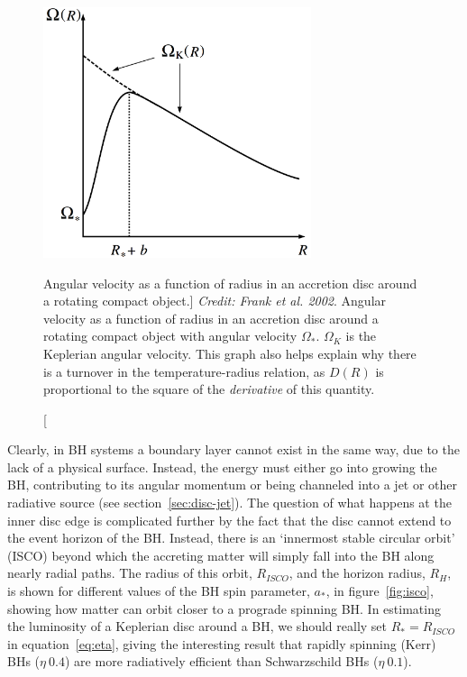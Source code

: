 \begin{figure}
\centering
\includegraphics[width=0.7\textwidth]{figures/01-intro/omega.png}
\caption
[Angular velocity as a function of radius in an accretion disc around a rotating
compact object.]
{
{\sl Credit: Frank et al. 2002}.
Angular velocity as a function of radius in an accretion disc around a rotating
compact object with angular velocity $\Omega_*$. $\Omega_K$ is the Keplerian 
angular velocity. This graph
also helps explain why there is a turnover in the temperature-radius relation,
as $D(R)$ is proportional to the square of the {\em derivative} of this quantity.
} 
\label{fig:omega}
\end{figure}

Clearly, in BH systems a boundary layer cannot exist in the same way,
due to the lack of a physical surface. Instead, the energy must either go into
growing the BH, contributing to its angular momentum or being
channeled into a jet or other radiative source (see section~\ref{sec:disc-jet}).
The question of what happens at the inner disc edge
is complicated further by the fact that the disc cannot extend to the 
event horizon of the BH. Instead, there is an `innermost stable circular orbit' (ISCO)
beyond which the accreting matter will simply fall 
into the BH along nearly radial paths. The radius
of this orbit, $R_{ISCO}$, and the horizon radius, $R_H$,
is shown for different values of the BH spin parameter, $a_*$, 
in figure~\ref{fig:isco}, showing how matter can orbit closer to a prograde spinning BH. 
In estimating the luminosity of a Keplerian disc around a BH, 
we should really set $R_* = R_{ISCO}$ in equation~\ref{eq:eta}, 
giving the interesting result that rapidly spinning (Kerr) BHs ($\eta~0.4$)
are more radiatively efficient than Schwarzschild BHs ($\eta~0.1$).

